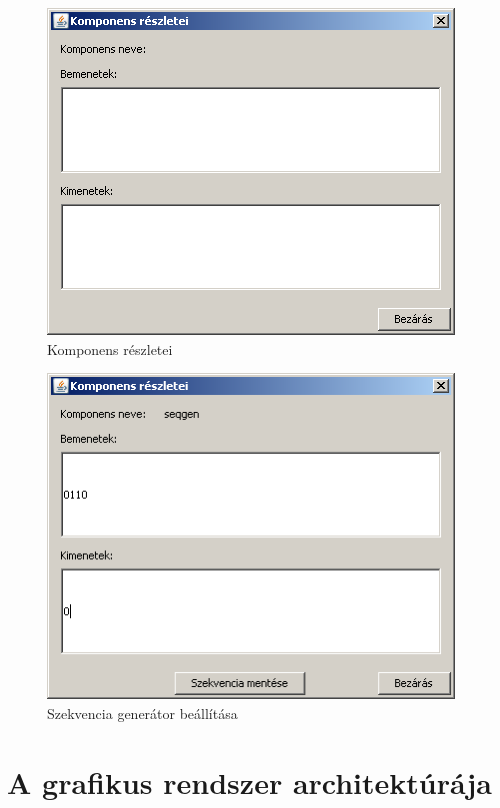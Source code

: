 \begin{figure}[H]
\begin{center}
\includegraphics[width=4.25in]{chapters/chapter11/screenshots/details.png}
\caption{Komponens részletei}
\label{fig:gui_szimseb}
\end{center}
\end{figure}

\begin{figure}[H]
\begin{center}
\includegraphics[width=4.25in]{chapters/chapter11/screenshots/details_sg.png}
\caption{Szekvencia generátor beállítása}
\label{fig:gui_szimseb}
\end{center}
\end{figure}


\section{A grafikus rendszer architektúrája}

